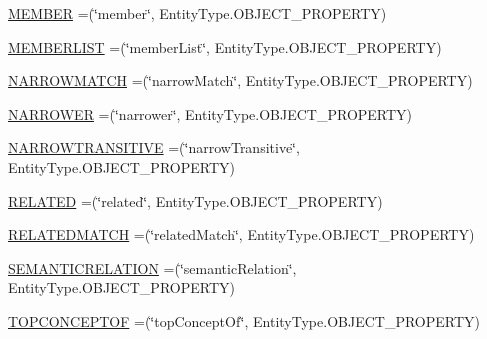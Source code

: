 \begin{DoxyCompactItemize}
\hyperlink{enumorg_1_1semanticweb_1_1owlapi_1_1vocab_1_1_s_k_o_s_vocabulary_abb5edbad947dc0d39be4db9d1c57e20a}{M\-E\-M\-B\-E\-R} =(\char`\"{}member\char`\"{}, Entity\-Type.\-O\-B\-J\-E\-C\-T\-\_\-\-P\-R\-O\-P\-E\-R\-T\-Y)
\item 
\hyperlink{enumorg_1_1semanticweb_1_1owlapi_1_1vocab_1_1_s_k_o_s_vocabulary_ad0da796cb24b2285980f888a400668bc}{M\-E\-M\-B\-E\-R\-L\-I\-S\-T} =(\char`\"{}member\-List\char`\"{}, Entity\-Type.\-O\-B\-J\-E\-C\-T\-\_\-\-P\-R\-O\-P\-E\-R\-T\-Y)
\item 
\hyperlink{enumorg_1_1semanticweb_1_1owlapi_1_1vocab_1_1_s_k_o_s_vocabulary_a54a179ee10f37640a1882b9106e78cda}{N\-A\-R\-R\-O\-W\-M\-A\-T\-C\-H} =(\char`\"{}narrow\-Match\char`\"{}, Entity\-Type.\-O\-B\-J\-E\-C\-T\-\_\-\-P\-R\-O\-P\-E\-R\-T\-Y)
\item 
\hyperlink{enumorg_1_1semanticweb_1_1owlapi_1_1vocab_1_1_s_k_o_s_vocabulary_a54c72f0876609c181e8a937190c59db1}{N\-A\-R\-R\-O\-W\-E\-R} =(\char`\"{}narrower\char`\"{}, Entity\-Type.\-O\-B\-J\-E\-C\-T\-\_\-\-P\-R\-O\-P\-E\-R\-T\-Y)
\item 
\hyperlink{enumorg_1_1semanticweb_1_1owlapi_1_1vocab_1_1_s_k_o_s_vocabulary_a3ee4ddc7e2104101190ebd0e7ede5d97}{N\-A\-R\-R\-O\-W\-T\-R\-A\-N\-S\-I\-T\-I\-V\-E} =(\char`\"{}narrow\-Transitive\char`\"{}, Entity\-Type.\-O\-B\-J\-E\-C\-T\-\_\-\-P\-R\-O\-P\-E\-R\-T\-Y)
\item 
\hyperlink{enumorg_1_1semanticweb_1_1owlapi_1_1vocab_1_1_s_k_o_s_vocabulary_aa0beaeecd8882920be49b98b88570805}{R\-E\-L\-A\-T\-E\-D} =(\char`\"{}related\char`\"{}, Entity\-Type.\-O\-B\-J\-E\-C\-T\-\_\-\-P\-R\-O\-P\-E\-R\-T\-Y)
\item 
\hyperlink{enumorg_1_1semanticweb_1_1owlapi_1_1vocab_1_1_s_k_o_s_vocabulary_abae13a100e0c0636fc27651dee11489a}{R\-E\-L\-A\-T\-E\-D\-M\-A\-T\-C\-H} =(\char`\"{}related\-Match\char`\"{}, Entity\-Type.\-O\-B\-J\-E\-C\-T\-\_\-\-P\-R\-O\-P\-E\-R\-T\-Y)
\item 
\hyperlink{enumorg_1_1semanticweb_1_1owlapi_1_1vocab_1_1_s_k_o_s_vocabulary_aa6680e12a4a9537bf97e17ec58f48a0d}{S\-E\-M\-A\-N\-T\-I\-C\-R\-E\-L\-A\-T\-I\-O\-N} =(\char`\"{}semantic\-Relation\char`\"{}, Entity\-Type.\-O\-B\-J\-E\-C\-T\-\_\-\-P\-R\-O\-P\-E\-R\-T\-Y)
\item 
\hyperlink{enumorg_1_1semanticweb_1_1owlapi_1_1vocab_1_1_s_k_o_s_vocabulary_a5d3f1af3d8462973753c1aa3a95cdd75}{T\-O\-P\-C\-O\-N\-C\-E\-P\-T\-O\-F} =(\char`\"{}top\-Concept\-Of\char`\"{}, Entity\-Type.\-O\-B\-J\-E\-C\-T\-\_\-\-P\-R\-O\-P\-E\-R\-T\-Y)
\item 

\end{DoxyCompactItemize}
